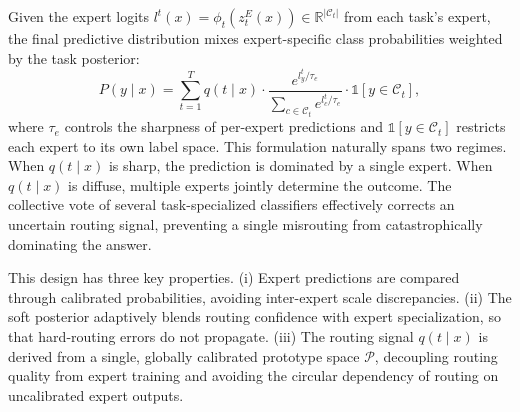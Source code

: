 Given the expert logits $l^t(x) = \phi_t(z_t^E(x)) \in \mathbb{R}^{|\mathcal{C}_t|}$ from each task's expert, the final predictive distribution mixes expert-specific class probabilities weighted by the task posterior:
\begin{equation}
P(y \mid x) = \sum_{t=1}^{T} q(t \mid x) \cdot \frac{e^{l_y^t / \tau_e}}{\sum_{c \in \mathcal{C}_t} e^{l_c^t / \tau_e}} \cdot \mathbb{1}[y \in \mathcal{C}_t],
\label{eq:fusion}
\end{equation}
where $\tau_e$ controls the sharpness of per-expert predictions and $\mathbb{1}[y \in \mathcal{C}_t]$ restricts each expert to its own label space. This formulation naturally spans two regimes. When $q(t \mid x)$ is sharp, the prediction is dominated by a single expert. When $q(t \mid x)$ is diffuse, multiple experts jointly determine the outcome. The collective vote of several task-specialized classifiers effectively corrects an uncertain routing signal, preventing a single misrouting from catastrophically dominating the answer.

This design has three key properties. (i) Expert predictions are compared through calibrated probabilities, avoiding inter-expert scale discrepancies. (ii) The soft posterior adaptively blends routing confidence with expert specialization, so that hard-routing errors do not propagate. (iii) The routing signal $q(t \mid x)$ is derived from a single, globally calibrated prototype space $\mathcal{P}$, decoupling routing quality from expert training and avoiding the circular dependency of routing on uncalibrated expert outputs.
